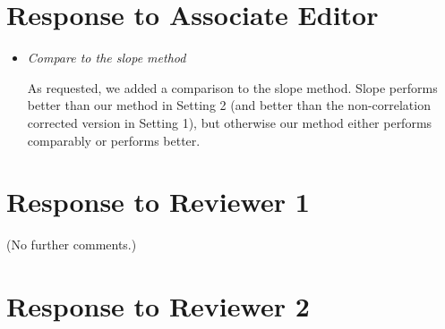 \documentclass[11pt]{article}
\begin{document}
\section*{Response to Associate Editor}

\begin{itemize}

\item \textit{Compare to the slope method}

As requested, we added a comparison to the slope method. Slope performs better
than our method in Setting 2 (and better than the non-correlation corrected
version in Setting 1), but otherwise our method either performs comparably or
performs better.

\end{itemize}


\section*{Response to Reviewer 1}

(No further comments.)


\section*{Response to Reviewer 2}
\end{document}
